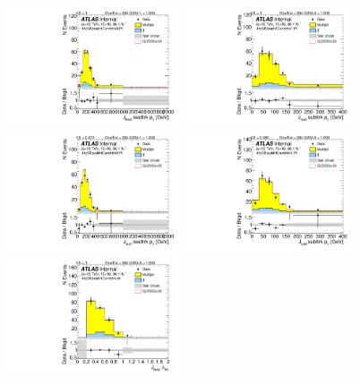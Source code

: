 \begin{figure}[htbp!]
\begin{center}
\includegraphics[width=0.45\textwidth,angle=-90]{figures/boosted/Sideband/b77_FourTag_Sideband_leadHCand_trk0_Pt.pdf}
\includegraphics[width=0.45\textwidth,angle=-90]{figures/boosted/Sideband/b77_FourTag_Sideband_leadHCand_trk1_Pt.pdf}\\
\includegraphics[width=0.45\textwidth,angle=-90]{figures/boosted/Sideband/b77_FourTag_Sideband_sublHCand_trk0_Pt.pdf}
\includegraphics[width=0.45\textwidth,angle=-90]{figures/boosted/Sideband/b77_FourTag_Sideband_sublHCand_trk1_Pt.pdf}\\
\includegraphics[width=0.45\textwidth,angle=-90]{figures/boosted/Sideband/b77_FourTag_Sideband_leadHCand_trk_dr.pdf}

\end{center}
\end{figure}
